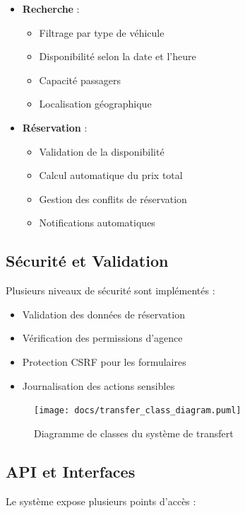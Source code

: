 \begin{itemize}
    \item \textbf{Recherche} :
    \begin{itemize}
        \item Filtrage par type de véhicule
        \item Disponibilité selon la date et l'heure
        \item Capacité passagers
        \item Localisation géographique
    \end{itemize}
    
    \item \textbf{Réservation} :
    \begin{itemize}
        \item Validation de la disponibilité
        \item Calcul automatique du prix total
        \item Gestion des conflits de réservation
        \item Notifications automatiques
    \end{itemize}
\end{itemize}

\subsection{Sécurité et Validation}
Plusieurs niveaux de sécurité sont implémentés :

\begin{itemize}
    \item Validation des données de réservation
    \item Vérification des permissions d'agence
    \item Protection CSRF pour les formulaires
    \item Journalisation des actions sensibles
\end{itemize}

\begin{figure}[h!]
    \centering
    \texttt{[image: docs/transfer\_class\_diagram.puml]}
    \caption{Diagramme de classes du système de transfert}
    \label{fig:transfer_class_diagram}
\end{figure}

\subsection{API et Interfaces}
Le système expose plusieurs points d'accès :

